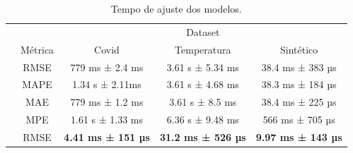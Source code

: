\begin{table}[!htp]
    \caption{Tempo de ajuste dos modelos.}
    \setlength\extrarowheight{5pt}
    \begin{tabular}{|c|c|ccc|}
        \hline
        \rowcolor[HTML]{C0C0C0}
        \cellcolor[HTML]{C0C0C0}                          & \cellcolor[HTML]{C0C0C0}                          & \multicolumn{3}{c|}{\cellcolor[HTML]{C0C0C0}Dataset}                                                                                                                         \\ \cline{3-5}
        \rowcolor[HTML]{C0C0C0}
        \multirow{-2}{*}{\cellcolor[HTML]{C0C0C0}Modelo}  & \multirow{-2}{*}{\cellcolor[HTML]{C0C0C0}Métrica} & \multicolumn{1}{c|}{\cellcolor[HTML]{C0C0C0}Covid}                      & \multicolumn{1}{c|}{\cellcolor[HTML]{C0C0C0}Temperatura}               & Sintético                 \\ \hline
        \cellcolor[HTML]{C0C0C0}                          & RMSE                                              & \multicolumn{1}{c|}{779 ms ± 2.4 ms}                                    & \multicolumn{1}{c|}{3.61 s ± 5.34 ms}                                  & 38.4 ms ± 383 µs          \\ \cline{2-5}
        \rowcolor[HTML]{EFEFEF}
        \cellcolor[HTML]{C0C0C0}                          & MAPE                                              & \multicolumn{1}{c|}{\cellcolor[HTML]{EFEFEF}1.34 s ± 2.11ms}            & \multicolumn{1}{c|}{\cellcolor[HTML]{EFEFEF}3.61 s ± 4.68 ms}          & 38.3 ms ± 184 µs          \\ \cline{2-5}
        \cellcolor[HTML]{C0C0C0}                          & MAE                                               & \multicolumn{1}{c|}{779 ms ± 1.2 ms}                                    & \multicolumn{1}{c|}{3.61 s ± 8.5 ms}                                   & 38.4 ms ± 225 µs          \\ \cline{2-5}
        \rowcolor[HTML]{EFEFEF}
        \multirow{-4}{*}{\cellcolor[HTML]{C0C0C0}ARIMA}   & MPE                                               & \multicolumn{1}{c|}{\cellcolor[HTML]{EFEFEF}1.61 s ± 1.33 ms}           & \multicolumn{1}{c|}{\cellcolor[HTML]{EFEFEF}6.36 s ± 9.48 ms}          & 566 ms ± 705 µs           \\ \hline
        \cellcolor[HTML]{C0C0C0}                          & RMSE                                              & \multicolumn{1}{c|}{\textbf{4.41 ms ± 151 µs}}                          & \multicolumn{1}{c|}{\textbf{31.2 ms ± 526 µs}}                         & \textbf{9.97 ms ± 143 µs} \\ \cline{2-5}

\end{tabular}
\end{table}
